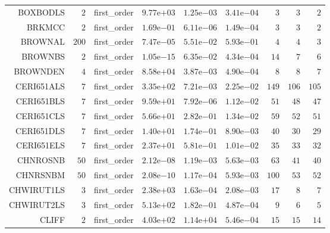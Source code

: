 \begin{longtable}{rrrrrrrrr}
BOXBODLS & \(     2\) & first\_order & \( 9.77\)e\(+03\) & \( 1.25\)e\(-03\) & \( 3.41\)e\(-04\) & \(     3\) & \(     3\) & \(     2\) \\
BRKMCC & \(     2\) & first\_order & \( 1.69\)e\(-01\) & \( 6.11\)e\(-06\) & \( 1.49\)e\(-04\) & \(     3\) & \(     3\) & \(     2\) \\
BROWNAL & \(   200\) & first\_order & \( 7.47\)e\(-05\) & \( 5.51\)e\(-02\) & \( 5.93\)e\(-01\) & \(     4\) & \(     4\) & \(     3\) \\
BROWNBS & \(     2\) & first\_order & \( 1.05\)e\(-15\) & \( 6.35\)e\(-02\) & \( 4.34\)e\(-04\) & \(    14\) & \(     7\) & \(     6\) \\
BROWNDEN & \(     4\) & first\_order & \( 8.58\)e\(+04\) & \( 3.87\)e\(-03\) & \( 4.90\)e\(-04\) & \(     8\) & \(     8\) & \(     7\) \\
CERI651ALS & \(     7\) & first\_order & \( 3.35\)e\(+02\) & \( 7.21\)e\(-03\) & \( 2.25\)e\(-02\) & \(   149\) & \(   106\) & \(   105\) \\
CERI651BLS & \(     7\) & first\_order & \( 9.59\)e\(+01\) & \( 7.92\)e\(-06\) & \( 1.12\)e\(-02\) & \(    51\) & \(    48\) & \(    47\) \\
CERI651CLS & \(     7\) & first\_order & \( 5.66\)e\(+01\) & \( 2.82\)e\(-01\) & \( 1.34\)e\(-02\) & \(    59\) & \(    52\) & \(    51\) \\
CERI651DLS & \(     7\) & first\_order & \( 1.40\)e\(+01\) & \( 1.74\)e\(-01\) & \( 8.90\)e\(-03\) & \(    40\) & \(    30\) & \(    29\) \\
CERI651ELS & \(     7\) & first\_order & \( 2.37\)e\(+01\) & \( 5.81\)e\(-01\) & \( 1.01\)e\(-02\) & \(    35\) & \(    33\) & \(    32\) \\
CHNROSNB & \(    50\) & first\_order & \( 2.12\)e\(-08\) & \( 1.19\)e\(-03\) & \( 5.63\)e\(-03\) & \(    63\) & \(    41\) & \(    40\) \\
CHNRSNBM & \(    50\) & first\_order & \( 2.08\)e\(-10\) & \( 1.17\)e\(-04\) & \( 5.93\)e\(-03\) & \(   100\) & \(    53\) & \(    52\) \\
CHWIRUT1LS & \(     3\) & first\_order & \( 2.38\)e\(+03\) & \( 1.63\)e\(-04\) & \( 2.08\)e\(-03\) & \(    17\) & \(     8\) & \(     7\) \\
CHWIRUT2LS & \(     3\) & first\_order & \( 5.13\)e\(+02\) & \( 1.82\)e\(-01\) & \( 4.87\)e\(-04\) & \(     9\) & \(     6\) & \(     5\) \\
CLIFF & \(     2\) & first\_order & \( 4.03\)e\(+02\) & \( 1.14\)e\(+04\) & \( 5.46\)e\(-04\) & \(    15\) & \(    15\) & \(    14\) \\

\end{longtable}
